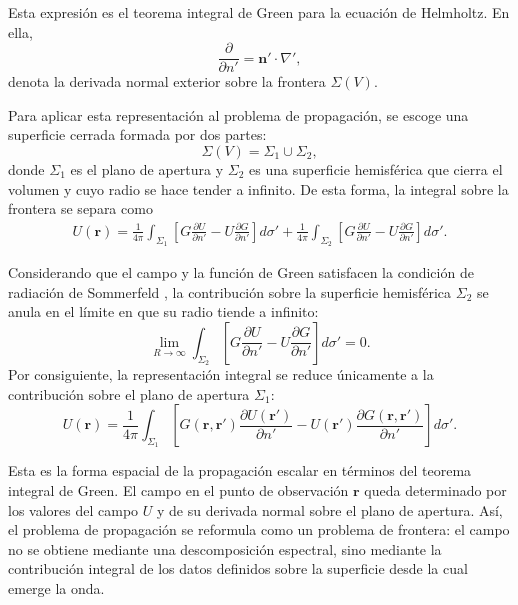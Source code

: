 Esta expresión es el teorema integral de Green para la ecuación de Helmholtz. En ella,
\begin{equation}
\frac{\partial}{\partial n'}
=
\mathbf n'\cdot\nabla',
\end{equation}
denota la derivada normal exterior sobre la frontera \(\Sigma(V)\).

Para aplicar esta representación al problema de propagación, se escoge una superficie cerrada formada por dos partes:
\begin{equation}
\Sigma(V)=\Sigma_1\cup\Sigma_2,
\end{equation}
donde \(\Sigma_1\) es el plano de apertura y \(\Sigma_2\) es una superficie hemisférica que cierra el volumen y cuyo radio se hace tender a infinito. De esta forma, la integral sobre la frontera se separa como
\begin{equation}
\begin{aligned}
U(\mathbf r)
=
\frac{1}{4\pi}
\int_{\Sigma_1}
\left[
G\frac{\partial U}{\partial n'}
-
U\frac{\partial G}{\partial n'}
\right]
d\sigma'
+
\frac{1}{4\pi}
\int_{\Sigma_2}
\left[
G\frac{\partial U}{\partial n'}
-
U\frac{\partial G}{\partial n'}
\right]
d\sigma'.
\end{aligned}
\label{eq:Green_integral_split_boundary}
\end{equation}

Considerando que el campo y la función de Green satisfacen la condición de radiación de Sommerfeld \cite{jackson1999}, la contribución sobre la superficie hemisférica \(\Sigma_2\) se anula en el límite en que su radio tiende a infinito:
\begin{equation}
\lim_{R\to\infty}
\int_{\Sigma_2}
\left[
G\frac{\partial U}{\partial n'}
-
U\frac{\partial G}{\partial n'}
\right]
d\sigma'
=
0.
\label{eq:Sommerfeld_condition_boundary_vanishes}
\end{equation}
Por consiguiente, la representación integral se reduce únicamente a la contribución sobre el plano de apertura \(\Sigma_1\):
\begin{equation}
U(\mathbf r)
=
\frac{1}{4\pi}
\int_{\Sigma_1}
\left[
G(\mathbf r,\mathbf r')
\frac{\partial U(\mathbf r')}{\partial n'}
-
U(\mathbf r')
\frac{\partial G(\mathbf r,\mathbf r')}{\partial n'}
\right]
d\sigma'.
\label{eq:Green_integral_aperture_plane}
\end{equation}

Esta es la forma espacial de la propagación escalar en términos del teorema integral de Green. El campo en el punto de observación \(\mathbf r\) queda determinado por los valores del campo \(U\) y de su derivada normal sobre el plano de apertura. Así, el problema de propagación se reformula como un problema de frontera: el campo no se obtiene mediante una descomposición espectral, sino mediante la contribución integral de los datos definidos sobre la superficie desde la cual emerge la onda.

